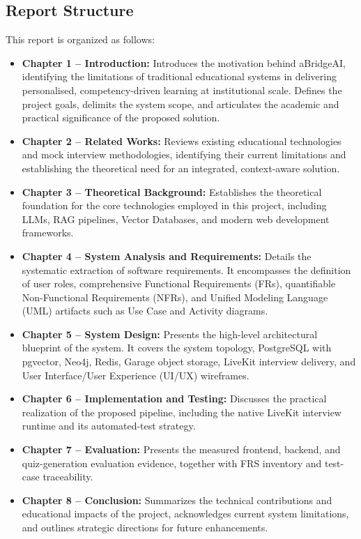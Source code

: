 \subsection{Report Structure}

\noindent This report is organized as follows:

\begin{itemize}
    \item \textbf{Chapter 1 -- Introduction:} Introduces the motivation behind aBridgeAI, identifying the limitations of traditional educational systems in delivering personalised, competency-driven learning at institutional scale. Defines the project goals, delimits the system scope, and articulates the academic and practical significance of the proposed solution.
    \item \textbf{Chapter 2 -- Related Works:} Reviews existing educational technologies and mock interview methodologies, identifying their current limitations and establishing the theoretical need for an integrated, context-aware solution.
    \item \textbf{Chapter 3 -- Theoretical Background:} Establishes the theoretical foundation for the core technologies employed in this project, including LLMs, RAG pipelines, Vector Databases, and modern web development frameworks.
    \item \textbf{Chapter 4 -- System Analysis and Requirements:} Details the systematic extraction of software requirements. It encompasses the definition of user roles, comprehensive Functional Requirements (FRs), quantifiable Non-Functional Requirements (NFRs), and Unified Modeling Language (UML) artifacts such as Use Case and Activity diagrams.
    \item \textbf{Chapter 5 -- System Design:} Presents the high-level architectural blueprint of the system. It covers the system topology, PostgreSQL with pgvector, Neo4j, Redis, Garage object storage, LiveKit interview delivery, and User Interface/User Experience (UI/UX) wireframes.
    \item \textbf{Chapter 6 -- Implementation and Testing:} Discusses the practical realization of the proposed pipeline, including the native LiveKit interview runtime and its automated-test strategy.
    \item \textbf{Chapter 7 -- Evaluation:} Presents the measured frontend, backend, and quiz-generation evaluation evidence, together with FRS inventory and test-case traceability.
    \item \textbf{Chapter 8 -- Conclusion:} Summarizes the technical contributions and educational impacts of the project, acknowledges current system limitations, and outlines strategic directions for future enhancements.
\end{itemize}